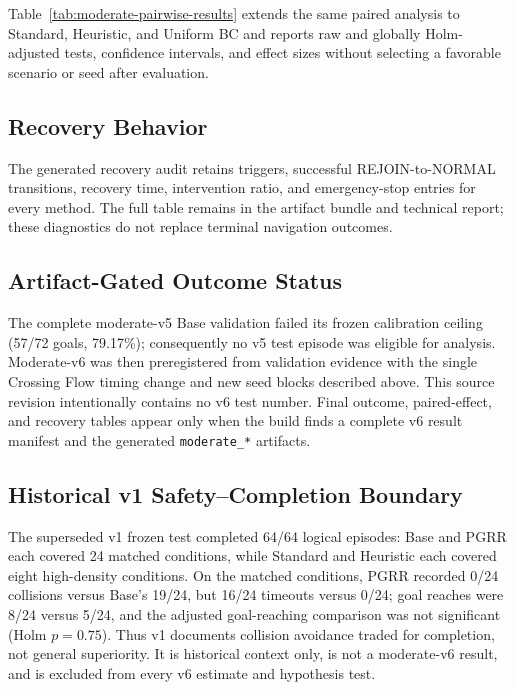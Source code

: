 Table~\ref{tab:moderate-pairwise-results} extends the same paired analysis to
Standard, Heuristic, and Uniform BC and reports raw and globally Holm-adjusted
tests, confidence intervals, and effect sizes without selecting a favorable
scenario or seed after evaluation.



\subsection{Recovery Behavior}
The generated recovery audit retains triggers, successful REJOIN-to-NORMAL
transitions, recovery time, intervention ratio, and emergency-stop entries for
every method.  The full table remains in the artifact bundle and technical
report; these diagnostics do not replace terminal navigation outcomes.

\else
\subsection{Artifact-Gated Outcome Status}
The complete moderate-v5 Base validation failed its frozen calibration ceiling
(57/72 goals, 79.17\%); consequently no v5 test episode was eligible for
analysis.  Moderate-v6 was then preregistered from validation evidence with the
single Crossing Flow timing change and new seed blocks described above.  This
source revision intentionally contains no v6 test number.  Final outcome,
paired-effect, and recovery tables appear only when the build finds a complete
v6 result manifest and the generated \texttt{moderate\_*} artifacts.
\fi

\subsection{Historical v1 Safety--Completion Boundary}
The superseded v1 frozen test completed 64/64 logical episodes: Base and PGRR
each covered 24 matched conditions, while Standard and Heuristic each covered
eight high-density conditions.  On the matched conditions, PGRR recorded 0/24
collisions versus Base's 19/24, but 16/24 timeouts versus 0/24; goal reaches
were 8/24 versus 5/24, and the adjusted goal-reaching comparison was not
significant (Holm $p=0.75$).  Thus v1 documents collision avoidance traded for
completion, not general superiority.  It is historical context only, is not a
moderate-v6 result, and is excluded from every v6 estimate and hypothesis test.

